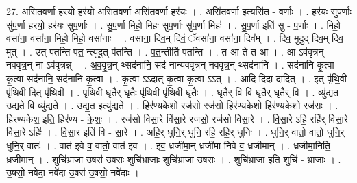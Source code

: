\documentclass[17pt]{extarticle}
\begin{document}
27. असि॑तवर्णा॒ हर॑यो॒ हर॑यो॒ असि॑तवर्णा॒ असि॑तवर्णा॒ हर॑यः । . असि॑तवर्णा॒ इत्यसि॑त - व॒र्णाः॒ । . हर॑यः सुप॒र्णाः सु॑प॒र्णा हर॑यो॒ हर॑यः सुप॒र्णाः । . सु॒प॒र्णा मिहो॒ मिहः॑ सुप॒र्णाः सु॑प॒र्णा मिहः॑ । . सु॒प॒र्णा इति॑ सु - प॒र्णाः । . मिहो॒ वसा॑ना॒ वसा॑ना॒ मिहो॒ मिहो॒ वसा॑नाः । . वसा॑ना॒ दिव॒म् दिवं॒ ॅवसा॑ना॒ वसा॑ना॒ दिव᳚म् । . दिव॒ मुदुद् दिव॒म् दिव॒ मुत् । . उत् प॑तन्ति पत॒ न्त्युदुत् प॑तन्ति । . प॒त॒न्तीति॑ पतन्ति । . त आ ते त आ । . आ ऽव॑वृत्रन् नववृत्र॒न् ना ऽव॑वृत्रन्न् । . अ॒व॒वृ॒त्र॒न् थ्सद॑नानि॒ सद॑ नान्यववृत्रन् नववृत्र॒न् थ्सद॑नानि । . सद॑नानि कृ॒त्वा कृ॒त्वा सद॑नानि॒ सद॑नानि कृ॒त्वा । . कृ॒त्वा ऽऽदात् कृ॒त्वा कृ॒त्वा ऽऽत् । . आदि दिदा दादित् । . इत् पृ॑थि॒वी पृ॑थि॒वी दित् पृ॑थि॒वी । . पृ॒थि॒वी घृ॒तैर् घृ॒तैः पृ॑थि॒वी पृ॑थि॒वी घृ॒तैः । . घृ॒तैर् वि वि घृ॒तैर् घृ॒तैर् वि । . व्यु॑द्यत उद्यते॒ वि व्यु॑द्यते । . उ॒द्य॒त॒ इत्यु॑द्यते । . हिर॑ण्यकेशो॒ रज॑सो॒ रज॑सो॒ हिर॑ण्यकेशो॒ हिर॑ण्यकेशो॒ रज॑सः । . हिर॑ण्यकेश॒ इति॒ हिर॑ण्य - के॒शः॒ । . रज॑सो विसा॒रे वि॑सा॒रे रज॑सो॒ रज॑सो विसा॒रे । . वि॒सा॒रे ऽहि॒ रहि॑र् विसा॒रे वि॑सा॒रे ऽहिः॑ । . वि॒सा॒र इति॑ वि - सा॒रे । . अहि॒र् धुनि॒र् धुनि॒ रहि॒ रहि॒र् धुनिः॑ । . धुनि॒र् वातो॒ वातो॒ धुनि॒र् धुनि॒र् वातः॑ । . वात॑ इवे व॒ वातो॒ वात॑ इव । . इ॒व॒ ध्रजी॑मा॒न् ध्रजी॑मा निवे व॒ ध्रजी॑मान् । . ध्रजी॑मा॒निति॒ ध्रजी॑मान् । . शुचि॑भ्राजा उ॒षस॑ उ॒षसः॒ शुचि॑भ्राजाः॒ शुचि॑भ्राजा उ॒षसः॑ । . शुचि॑भ्राजा॒ इति॒ शुचि॑ - भ्रा॒जाः॒ । . उ॒षसो॒ नवे॑दा॒ नवे॑दा उ॒षस॑ उ॒षसो॒ नवे॑दाः । \newline
\end{document}
